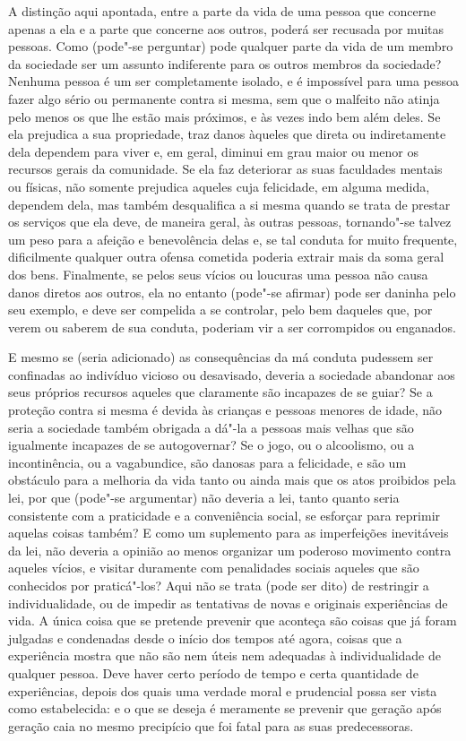 A distinção aqui apontada, entre a parte da vida de uma pessoa que
concerne apenas a ela e a parte que concerne aos outros, poderá ser
recusada por muitas pessoas. Como (pode"-se perguntar) pode qualquer
parte da vida de um membro da sociedade ser um assunto indiferente para
os outros membros da sociedade? Nenhuma pessoa é um ser completamente
isolado, e é impossível para uma pessoa fazer algo sério ou permanente
contra si mesma, sem que o malfeito não atinja pelo menos os que lhe
estão mais próximos, e às vezes indo bem além deles. Se ela prejudica a
sua propriedade, traz danos àqueles que direta ou indiretamente
dela dependem para viver e, em geral, diminui em grau maior ou menor os
recursos gerais da comunidade. Se ela faz deteriorar as suas faculdades
mentais ou físicas, não somente prejudica aqueles cuja felicidade, em
alguma medida, dependem dela, mas também desqualifica a si
mesma quando se trata de prestar os serviços que ela deve, de maneira
geral, às outras pessoas, tornando"-se talvez um peso para a afeição e
benevolência delas e, se tal conduta for muito frequente, dificilmente
qualquer outra ofensa cometida poderia extrair mais da soma geral dos
bens. Finalmente, se pelos seus vícios ou loucuras uma pessoa não causa
danos diretos aos outros, ela no entanto (pode"-se afirmar)
pode ser daninha pelo seu exemplo, e deve ser
compelida a se controlar, pelo bem daqueles que, por verem ou saberem
de sua conduta, poderiam vir a ser corrompidos ou enganados. 

E mesmo se (seria adicionado) as consequências da má conduta
pudessem ser confinadas ao indivíduo vicioso ou desavisado, deveria a
sociedade abandonar aos seus próprios recursos aqueles que claramente
são incapazes de se guiar? Se a proteção contra si mesma é devida às
crianças e pessoas menores de idade, não seria a sociedade também
obrigada a dá"-la a pessoas mais velhas que são igualmente incapazes
de se autogovernar? Se o jogo, ou o alcoolismo, ou a incontinência,
ou a vagabundice, são danosas para a felicidade, e são um obstáculo
para a melhoria da vida tanto ou ainda mais que os atos proibidos pela
lei, por que (pode"-se argumentar) não deveria a lei, tanto quanto seria
consistente com a praticidade e a conveniência social, se esforçar para
reprimir aquelas coisas também? E como um suplemento para as
imperfeições inevitáveis da lei, não deveria a opinião ao menos
organizar um poderoso movimento contra aqueles vícios, e visitar
duramente com penalidades sociais aqueles que são conhecidos por
praticá"-los? Aqui não se trata (pode ser dito) de restringir a
individualidade, ou de impedir as tentativas de novas e originais
experiências de vida. A única coisa que se pretende prevenir que
aconteça são coisas que já foram julgadas e condenadas desde o início
dos tempos até agora, coisas que a experiência mostra que não são nem
úteis nem adequadas à individualidade de qualquer pessoa. Deve haver
certo período de tempo e certa quantidade de experiências, depois dos
quais uma verdade moral e prudencial possa ser vista como estabelecida:
e o que se deseja é meramente se prevenir que geração após geração caia
no mesmo precipício que foi fatal para as suas predecessoras.

